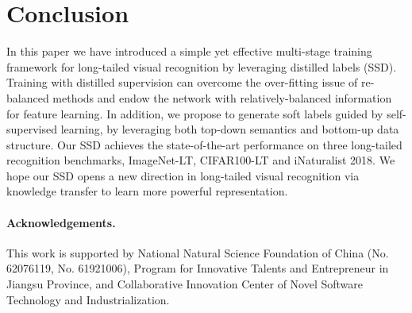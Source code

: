 \documentclass[10pt,twocolumn,letterpaper]{article}
\begin{document}
\section{Conclusion}
In this paper we have introduced a simple yet effective multi-stage training framework for long-tailed visual recognition by leveraging distilled labels (SSD). Training with distilled supervision can overcome the over-fitting issue of re-balanced methods and endow the network with relatively-balanced information for feature learning. In addition, we propose to generate soft labels guided by self-supervised learning, by leveraging both top-down semantics and bottom-up data structure. Our SSD achieves the state-of-the-art performance on three long-tailed recognition benchmarks, ImageNet-LT, CIFAR100-LT and iNaturalist 2018. We hope our SSD opens a new direction in long-tailed visual recognition via knowledge transfer to learn more powerful representation.

\vspace{-2mm}
\small \paragraph{\bf Acknowledgements.} This work is supported by National Natural Science Foundation of China (No. 62076119, No. 61921006), Program for Innovative Talents and Entrepreneur in Jiangsu Province, and Collaborative Innovation Center of Novel Software Technology and Industrialization.
\clearpage

{\small


}
\end{document}
